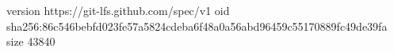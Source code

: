version https://git-lfs.github.com/spec/v1
oid sha256:86c546bebfd023fe57a5824cdeba6f48a0a56abd96459c55170889fc49de39fa
size 43840
